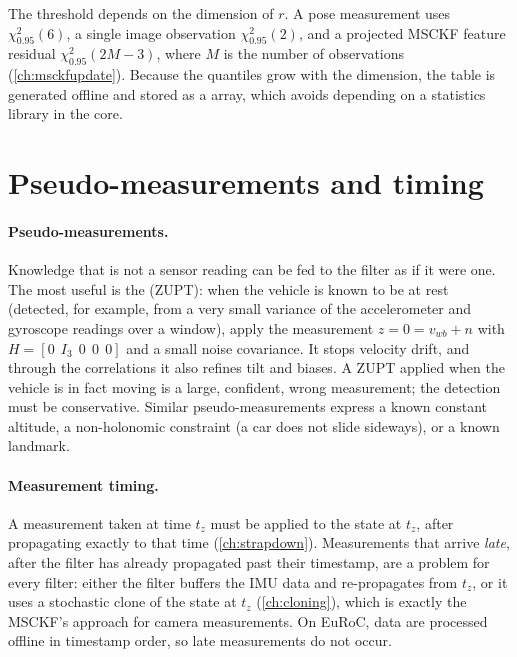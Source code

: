 The threshold depends on the dimension of $r$. A pose measurement uses $\chi^2_{0.95}(6)$, a single image
observation $\chi^2_{0.95}(2)$, and a projected MSCKF feature residual $\chi^2_{0.95}(2M-3)$, where $M$ is the number of
observations (\cref{ch:msckfupdate}). Because the quantiles grow with the dimension, the table is generated offline
and stored as a  array, which avoids depending on a statistics library in the core.

\section{Pseudo-measurements and timing}

\paragraph{Pseudo-measurements.} Knowledge that is not a sensor reading can be fed to the filter as if it were one. The most useful is the  (ZUPT): when the vehicle is known to be at rest (detected, for example, from a very small variance of the accelerometer and gyroscope readings over
a window), apply the measurement $z = 0 = v_{wb} + n$ with $H = [0\ \ I_3\ \ 0\ \ 0\ \ 0]$ and a small noise covariance. It stops velocity drift, and through the
correlations it also refines tilt and biases. A ZUPT applied when the vehicle is in fact moving is a large, confident, wrong measurement; the detection must
be conservative. Similar pseudo-measurements express a known constant altitude, a non-holonomic constraint (a car does not slide sideways), or a
known landmark.

\paragraph{Measurement timing.} A measurement taken at time $t_z$ must be applied to the state at $t_z$, after propagating exactly to that time
(\cref{ch:strapdown}). Measurements that arrive \emph{late}, after the filter has already propagated past their timestamp, are a problem for every filter:
either the filter buffers the IMU data and re-propagates from $t_z$, or it uses a stochastic clone of the state at $t_z$ (\cref{ch:cloning}), which is exactly the
MSCKF's approach for camera measurements. On EuRoC, data are processed offline in timestamp order, so late measurements do not occur.


